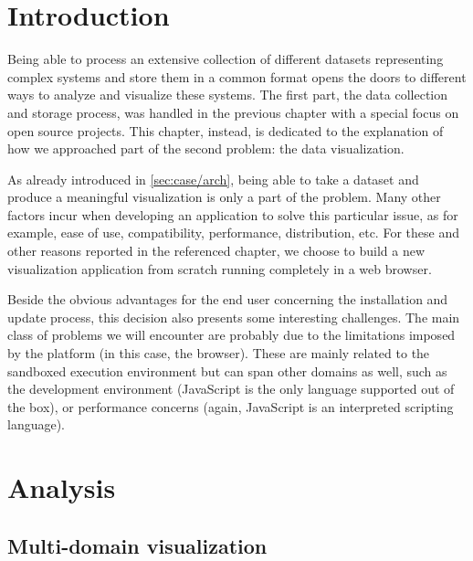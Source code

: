 
\section{Introduction}

Being able to process an extensive collection of different datasets representing complex systems and store them in a common format opens the doors to different ways to analyze and visualize these systems. The first part, the data collection and storage process, was handled in the previous chapter with a special focus on open source projects. This chapter, instead, is dedicated to the explanation of how we approached part of the second problem: the data visualization.

As already introduced in \vref{sec:case/arch}, being able to take a dataset and produce a meaningful visualization is only a part of the problem. Many other factors incur when developing an application to solve this particular issue, as for example, ease of use, compatibility, performance, distribution, etc. For these and other reasons reported in the referenced chapter, we choose to build a new visualization application from scratch running completely in a web browser.

Beside the obvious advantages for the end user concerning the installation and update process, this decision also presents some interesting challenges. The main class of problems we will encounter are probably due to the limitations imposed by the platform (in this case, the browser). These are mainly related to the sandboxed execution environment but can span other domains as well, such as the development environment (JavaScript is the only language supported out of the box), or performance concerns (again, JavaScript is an interpreted scripting language).


\section{Analysis}
\label{sec:visu/analysis}

\subsection{Multi-domain visualization}

